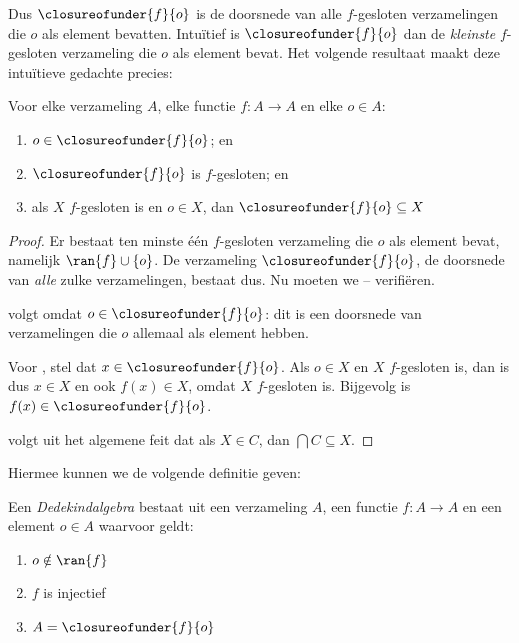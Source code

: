 \documentclass[../../../include/open-logic-section]{subfiles}
\begin{document}
Dus $\closureofunder{f}{o}$ is de doorsnede van alle $f$-gesloten
verzamelingen die $o$ als element bevatten. Intuïtief is
$\closureofunder{f}{o}$ dan de \emph{kleinste} $f$-gesloten verzameling
die $o$ als element bevat. Het volgende resultaat maakt deze
intuïtieve gedachte precies:
\begin{lem}
	Voor elke verzameling $A$, elke functie $f \colon A \to A$ en elke
	$o \in A$:
	\begin{enumerate}
		\item{} $o \in \closureofunder{f}{o}$; en
		\item{} $\closureofunder{f}{o}$ is $f$-gesloten; en
		\item{} als $X$ $f$-gesloten is en $o \in
		X$, dan $\closureofunder{f}{o} \subseteq X$
	\end{enumerate}
\end{lem}

\begin{proof}
Er bestaat ten minste één $f$-gesloten verzameling die $o$ als element
bevat, namelijk $\ran{f}\cup \{o\}$. De verzameling
$\closureofunder{f}{o}$, de doorsnede van \emph{alle} zulke
verzamelingen, bestaat dus. Nu moeten we
-- verifiëren.

 volgt omdat $o \in \closureofunder{f}{o}$: dit
is een doorsnede van verzamelingen die $o$ allemaal als element hebben.

Voor , stel dat $x \in \closureofunder{f}{o}$.
Als $o \in X$ en $X$ $f$-gesloten is, dan is dus $x \in X$ en ook
$f(x) \in X$, omdat $X$ $f$-gesloten is. Bijgevolg is
$f(x) \in \closureofunder{f}{o}$.

 volgt uit het algemene feit dat als $X \in C$,
dan $\bigcap C \subseteq X$.
\end{proof}

Hiermee kunnen we de volgende definitie geven:

\begin{defn}
Een \emph{Dedekindalgebra} bestaat uit een verzameling $A$, een functie
$f \colon A \to A$ en een element $o \in A$ waarvoor geldt:
	\begin{enumerate}
		\item {} $o \notin \ran{f}$
		\item {} $f$ is injectief
		\item {} $A = \closureofunder{f}{o}$
	\end{enumerate}
\end{defn}
\end{document}
